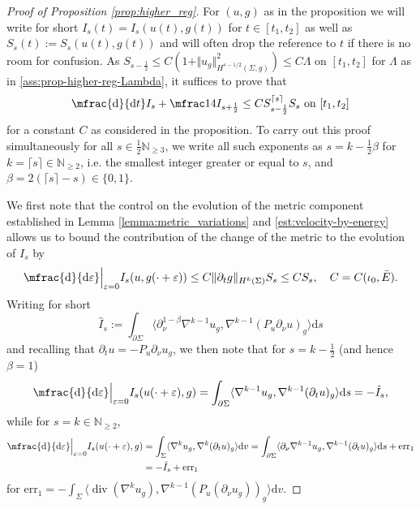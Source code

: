 \documentclass[10pt,reqno]{amsart}
\theoremstyle{plain}
\theoremstyle{definition}
\newcommand{\pnu}{\partial_\nu}
\numberwithin{equation}{section}
\newcommand{\La}{\Lambda}
\newcommand{\Si}{\Sigma}
\newcommand{\N}{\ensuremath{{\mathbb N}}}
\newcommand{\norm}[1]{\Vert#1\Vert}
\DeclareMathOperator{\Div}{div}
\newcommand{\beq}{\begin{equation}}
\newcommand{\eeq}{\end{equation}}
\newcommand{\beqa}{\begin{equation}\begin{aligned}}
\newcommand{\eeqa}{\end{aligned}\end{equation}}
\newcommand{\half}{\frac{1}{2}}
\newcommand{\dd}{\mathrm{d}} %
\newcommand{\pt}{\partial_t}
\newcommand{\eps}{\varepsilon}
\newcommand{\na}{\nabla}
\newcommand{\p}{\partial} %
\newcommand{\inner}[2]{\langle #1, #2\rangle} %
\newcommand{\err}{\text{err}}
\begin{document}
\begin{proof}[Proof of Proposition \ref{prop:higher_reg}]
    For $(u,g)$ as in the proposition we will write for short $I_s(t)=I_s(u(t),g(t))$ for $t\in [t_1,t_2]$ as well as $S_s(t):= S_s(u(t),g(t))$ and will often drop the reference to $t$ if there is no room for confusion. As $S_{s-\half}\leq C (1+\norm{u_{g}}_{H^{s-1/2}(\Si,g)}^2 )\leq C \La$ on $[t_1,t_2]$ for $\La$ as in \eqref{ass:prop-higher-reg-Lambda}, it suffices to prove that  
    \beq\label{est:diff-version-prop-higher}
        \mfrac{\dd}{\dd t}I_s+\mfrac14 I_{s+\half}\leq CS_{s-\half}^{ {\lceil s\rceil }}S_s \text{ on }  [t_1,t_2]
    \eeq 
    for a constant $C$ as considered in the proposition. To carry out this proof simultaneously for all $s\in \half \N_{\geq 3}$, we write all such exponents as $s=k-\half \beta$ for $k={\lceil s\rceil } \in \N_{\geq 2}$, i.e. the smallest integer greater or equal to $s$, and $\beta=2({\lceil s\rceil }-s)\in \{0,1\}$.

    We first note that the control on the evolution of the metric component established in Lemma \ref{lemma:metric_variations} and \eqref{est:velocity-by-energy} allows us to bound the contribution of the change of the metric to the evolution of $I_s$ by 
    \beqa \label{est:ddeps-Ik-metric}
    \mfrac{\dd}{\dd \eps}\Big\vert_{\eps=0}I_s(u,g(\cdot+\eps))\leq  C\norm{\p_t g}_{H^k(\Si)} S_s \leq C S_s, \quad C=C(\iota_0,\bar E).\eeqa
    Writing for short
    \beq\label{def:I-hat-k}
        \hat I_{s} := \int_{\p\Si}\inner{\p_\nu^{1-\beta }\nabla^{k-1}u_g}{\nabla^{k-1}(P_u \p_\nu u )_g}\dd s
    \eeq
    and recalling that $\pt u=-P_u \pnu u_g$, we then note that for $s=k-\half$ (and hence $\beta=1$) 
    $$\mfrac{\dd}{\dd \eps}\Big\vert_{\eps=0}I_s(u(\cdot +\eps ),g) = \int_{\p\Si}\inner{\nabla^{k-1}u_g}{\nabla^{k-1}(\p_tu)_g}\dd s=-\hat I_s,$$
    while for $s=k\in \N_{\geq 2}$,
    \beqa \label{est:ddeps-I-k}
    \mfrac{\dd}{\dd \eps}\Big\vert_{\eps=0}I_s(u(\cdot+\eps),g) &= \int_\Si \inner{\nabla^k u_g}{\nabla^k (\p_t u)_g} \dd v = \int_{\p\Si}\inner{\p_\nu\nabla^{k-1}u_g}{\nabla^{k-1}(\p_tu)_g}\dd s + \err_1\\
        &=-\hat I_s+\err_1
    \eeqa 
    for $\err_1=-\int_\Si \inner{\Div(\na^{k} u_g)}{\na^{k-1}(P_u(\p_\nu u_g))_g}\dd v$. 
    

\end{proof}
\end{document}
